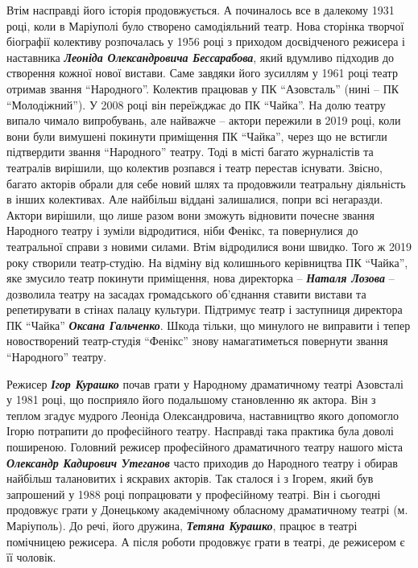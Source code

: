 Втім насправді його історія продовжується. А починалось все в далекому 1931
році, коли в Маріуполі було створено самодіяльний театр. Нова сторінка творчої
біографії колективу розпочалась у 1956 році з приходом досвідченого режисера і
наставника \emph{\textbf{Леоніда Олександровича Бессарабова}}, який вдумливо підходив до
створення кожної нової вистави. Саме завдяки його зусиллям у 1961 році театр
отримав звання \enquote{Народного}. Колектив працював у ПК \enquote{Азовсталь} (нині – ПК
\enquote{Молодіжний}). У 2008 році він переїжджає до ПК \enquote{Чайка}. На долю театру випало
чимало випробувань, але найважче – актори пережили в 2019 році, коли вони були
вимушені покинути приміщення ПК \enquote{Чайка}, через що не встигли підтвердити звання
\enquote{Народного} театру. Тоді в місті багато журналістів та театралів вирішили, що
колектив розпався і театр перестав існувати. Звісно, багато акторів обрали для
себе новий шлях та продовжили театральну діяльність в інших колективах. Але
найбільш віддані залишалися, попри всі негаразди. Актори вирішили, що лише
разом вони зможуть відновити почесне звання Народного театру і зуміли
відродитися, ніби Фенікс, та повернулися до театральної справи з новими силами.
Втім відродилися вони швидко. Того ж 2019 року створили театр-студію. На
відміну від колишнього керівництва ПК \enquote{Чайка}, яке змусило театр покинути
приміщення, нова директорка – \emph{\textbf{Наталя Лозова}} – дозволила театру на засадах
громадського об'єднання ставити вистави та репетирувати в стінах палацу
культури. Підтримує театр і заступниця директора ПК \enquote{Чайка} \emph{\textbf{Оксана Гальченко}}.
Шкода тільки, що минулого не виправити і тепер новостворений театр-студія
\enquote{Фенікс} знову намагатиметься повернути звання \enquote{Народного} театру.


Режисер \emph{\textbf{Ігор Курашко}} почав грати у Народному драматичному театрі Азовсталі у
1981 році, що посприяло його подальшому становленню як актора. Він з теплом
згадує  мудрого Леоніда Олександровича, наставництво якого допомогло Ігорю
потрапити до професійного театру. Насправді така практика була доволі
поширеною. Головний режисер професійного драматичного театру нашого міста
\emph{\textbf{Олександр Кадирович Утеганов}} часто приходив до Народного театру і обирав
найбільш талановитих і яскравих акторів. Так сталося і з Ігорем, який був
запрошений у 1988 році попрацювати у професійному театрі. Він і сьогодні
продовжує грати у Донецькому академічному обласному драматичному театрі (м.
Маріуполь). До речі, його дружина, \textbf{\emph{Тетяна Курашко}}, працює в театрі помічницею
режисера. А після роботи продовжує грати в театрі, де режисером є її чоловік.

